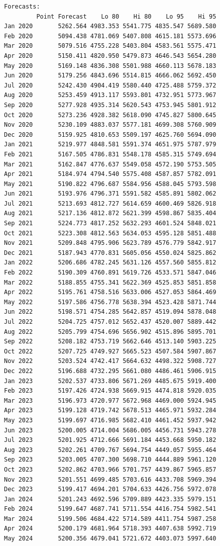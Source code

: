 \documentclass[
  letterpaper,
  DIV=11,
  numbers=noendperiod]{scrartcl}
\begin{document}
\begin{verbatim}
Forecasts:
         Point Forecast    Lo 80    Hi 80    Lo 95    Hi 95
Jan 2020       5262.564 4983.353 5541.775 4835.547 5689.580
Feb 2020       5094.438 4781.069 5407.808 4615.181 5573.696
Mar 2020       5079.516 4755.228 5403.804 4583.561 5575.471
Apr 2020       5150.411 4820.950 5479.873 4646.543 5654.280
May 2020       5169.148 4836.308 5501.988 4660.113 5678.183
Jun 2020       5179.256 4843.696 5514.815 4666.062 5692.450
Jul 2020       5242.430 4904.419 5580.440 4725.488 5759.372
Aug 2020       5253.459 4913.117 5593.801 4732.951 5773.967
Sep 2020       5277.928 4935.314 5620.543 4753.945 5801.912
Oct 2020       5273.236 4928.382 5618.090 4745.827 5800.645
Nov 2020       5230.109 4883.037 5577.181 4699.308 5760.909
Dec 2020       5159.925 4810.653 5509.197 4625.760 5694.090
Jan 2021       5219.977 4848.581 5591.374 4651.975 5787.979
Feb 2021       5167.505 4786.831 5548.178 4585.315 5749.694
Mar 2021       5162.847 4776.637 5549.058 4572.190 5753.505
Apr 2021       5184.974 4794.540 5575.408 4587.857 5782.091
May 2021       5190.822 4796.687 5584.956 4588.045 5793.598
Jun 2021       5193.976 4796.371 5591.582 4585.891 5802.062
Jul 2021       5213.693 4812.727 5614.659 4600.469 5826.918
Aug 2021       5217.136 4812.872 5621.399 4598.867 5835.404
Sep 2021       5224.773 4817.252 5632.293 4601.524 5848.021
Oct 2021       5223.308 4812.563 5634.053 4595.128 5851.488
Nov 2021       5209.848 4795.906 5623.789 4576.779 5842.917
Dec 2021       5187.943 4770.831 5605.056 4550.024 5825.862
Jan 2022       5206.686 4782.245 5631.126 4557.560 5855.812
Feb 2022       5190.309 4760.891 5619.726 4533.571 5847.046
Mar 2022       5188.855 4755.341 5622.369 4525.853 5851.858
Apr 2022       5195.761 4758.516 5633.006 4527.053 5864.469
May 2022       5197.586 4756.778 5638.394 4523.428 5871.744
Jun 2022       5198.571 4754.285 5642.857 4519.094 5878.048
Jul 2022       5204.725 4757.012 5652.437 4520.007 5889.442
Aug 2022       5205.799 4754.696 5656.902 4515.896 5895.701
Sep 2022       5208.182 4753.719 5662.646 4513.140 5903.225
Oct 2022       5207.725 4749.927 5665.523 4507.584 5907.867
Nov 2022       5203.524 4742.417 5664.632 4498.322 5908.727
Dec 2022       5196.688 4732.295 5661.080 4486.461 5906.915
Jan 2023       5202.537 4733.806 5671.269 4485.675 5919.400
Feb 2023       5197.426 4724.938 5669.915 4474.818 5920.035
Mar 2023       5196.973 4720.977 5672.968 4469.000 5924.945
Apr 2023       5199.128 4719.742 5678.513 4465.971 5932.284
May 2023       5199.697 4716.985 5682.410 4461.452 5937.942
Jun 2023       5200.005 4714.004 5686.005 4456.731 5943.278
Jul 2023       5201.925 4712.666 5691.184 4453.668 5950.182
Aug 2023       5202.261 4709.767 5694.754 4449.057 5955.464
Sep 2023       5203.005 4707.300 5698.710 4444.889 5961.120
Oct 2023       5202.862 4703.966 5701.757 4439.867 5965.857
Nov 2023       5201.551 4699.485 5703.616 4433.708 5969.394
Dec 2023       5199.417 4694.201 5704.633 4426.756 5972.078
Jan 2024       5201.243 4692.596 5709.889 4423.335 5979.151
Feb 2024       5199.647 4687.741 5711.554 4416.754 5982.541
Mar 2024       5199.506 4684.422 5714.589 4411.754 5987.258
Apr 2024       5200.179 4681.964 5718.393 4407.638 5992.719
May 2024       5200.356 4679.041 5721.672 4403.073 5997.640
\end{verbatim}
\end{document}
